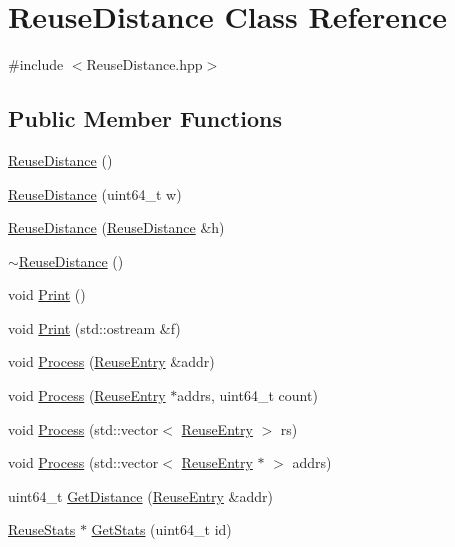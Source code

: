 \hypertarget{class_reuse_distance}{
\section{ReuseDistance Class Reference}
\label{class_reuse_distance}
}


{\ttfamily \#include $<$ReuseDistance.hpp$>$}

\subsection*{Public Member Functions}
\begin{DoxyCompactItemize}
\item 
\hyperlink{class_reuse_distance_ac29589f6171319984a46fdc7d0497c79}{ReuseDistance} ()
\item 
\hyperlink{class_reuse_distance_ab68a2d9df5c28571c3f8820c5344b2c1}{ReuseDistance} (uint64\_\-t w)
\item 
\hyperlink{class_reuse_distance_afff6c1153a623c687e1014df799c286d}{ReuseDistance} (\hyperlink{class_reuse_distance}{ReuseDistance} \&h)
\item 
\hyperlink{class_reuse_distance_a2846a6f2c045759657b754838045900d}{$\sim$ReuseDistance} ()
\item 
void \hyperlink{class_reuse_distance_a0cbab308f0c9262e570b994beac0544a}{Print} ()
\item 
void \hyperlink{class_reuse_distance_ac798c03bb891a51a6648df4b49e25212}{Print} (std::ostream \&f)
\item 
void \hyperlink{class_reuse_distance_a4ff6b77022ce62e0fdefa5cc297b932a}{Process} (\hyperlink{struct_reuse_entry}{ReuseEntry} \&addr)
\item 
void \hyperlink{class_reuse_distance_aed9cbdd99de67972a37de4624614de9d}{Process} (\hyperlink{struct_reuse_entry}{ReuseEntry} $\ast$addrs, uint64\_\-t count)
\item 
void \hyperlink{class_reuse_distance_a372960c10d5fb6552c8dfcfd77da38ba}{Process} (std::vector$<$ \hyperlink{struct_reuse_entry}{ReuseEntry} $>$ rs)
\item 
void \hyperlink{class_reuse_distance_a88052f5ae1e69bab8fe1f9b7b87c1037}{Process} (std::vector$<$ \hyperlink{struct_reuse_entry}{ReuseEntry} $\ast$ $>$ addrs)
\item 
uint64\_\-t \hyperlink{class_reuse_distance_ac70a23e9dc4b242f11d76e257e894bef}{GetDistance} (\hyperlink{struct_reuse_entry}{ReuseEntry} \&addr)
\item 
\hyperlink{class_reuse_stats}{ReuseStats} $\ast$ \hyperlink{class_reuse_distance_a771580c25dc5140969919e959e2ebdd1}{GetStats} (uint64\_\-t id)

\end{DoxyCompactItemize}
